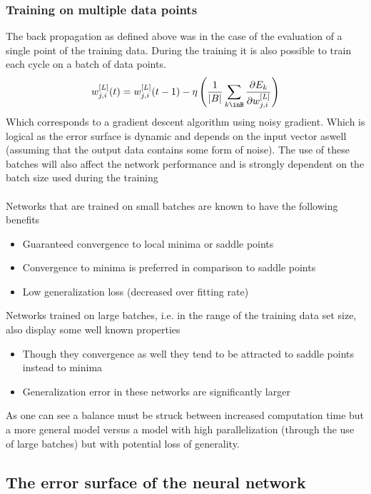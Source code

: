 \documentclass[12pt]{article}
\begin{document}
\subsubsection{Training on multiple data points}
The back propagation as defined above was in the case of the evaluation of a single point of the training data. During the training it is also possible to train each cycle on a batch of data points. 
\begin{equation}
w_{j,i}^{[L]}(t) = w_{j,i}^{[L]}(t-1) - \eta\left(\frac{1}{\lvert B\rvert}\sum_{k\inB} \frac{\partial E_k}{\partial w_{j,i}^{[L]} }\right)
\end{equation}
Which corresponds to a gradient descent algorithm using noisy gradient\cite{Keskar2016}. Which is logical as the error surface is dynamic and depends on the input vector aswell (assuming that the output data contains some form of noise). The use of these batches will also affect the network performance and is strongly dependent on the batch size used during the training
\\
\\
Networks that are trained on small batches are known to have the following benefits \cite{Smith2017, Keskar2016}
\begin{itemize}
	\item Guaranteed convergence to local minima or saddle points
	\item Convergence to minima is preferred in comparison to saddle points
	\item Low generalization loss (decreased over fitting rate)
\end{itemize} 
Networks trained on large batches, i.e. in the range of the training data set size, also display some well known properties\cite{Smith2017, Keskar2016}
\begin{itemize}
	\item Though they convergence as well they tend to be attracted to saddle points instead to minima
	\item Generalization error in these networks are significantly larger
\end{itemize}
As one can see a balance must be struck between increased computation time but a more general model versus a model with high parallelization (through the use of large batches) but with potential loss of generality.

\subsection{The error surface of the neural network}
\end{document}
